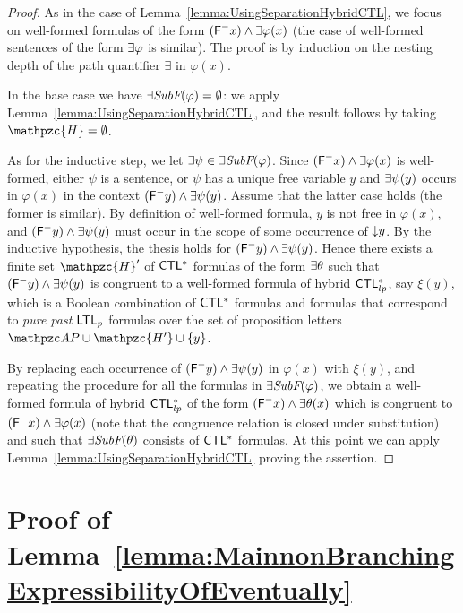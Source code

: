 \begin{proof}
As in the case of Lemma~\ref{lemma:UsingSeparationHybridCTL}, we focus on well-formed formulas of the form  $(\textsf{F}^{-} x)\wedge \exists \varphi(x)$ (the case of well-formed sentences of the form $\exists\varphi$ is similar).
%
The proof is by induction on the nesting depth of the path quantifier $\exists$ in $\varphi(x)$. 

In the base case we have $\exists\textit{SubF}(\varphi)=\emptyset$: we apply Lemma~\ref{lemma:UsingSeparationHybridCTL}, and the result follows by taking  $\mathpzc{H}=\emptyset$. 

As for the inductive step, 
we let $\exists \psi\in \exists\textit{SubF}(\varphi)$. Since $(\textsf{F}^{-} x)\wedge \exists \varphi(x)$ is well-formed, either $\psi$ is a sentence, or $\psi$ has a unique free variable $y$ and $\exists \psi(y)$ occurs in $\varphi(x)$ in the context $(\textsf{F}^{-} y)\wedge \exists \psi(y)$. Assume that the latter case holds (the former is similar). 
By definition of well-formed formula, $y$ is not free in $\varphi(x)$, and $(\textsf{F}^{-} y)\wedge \exists \psi(y)$ must occur in the scope of some occurrence of  $\text{$\downarrow$$y$}$.
By the inductive hypothesis, the thesis holds for $(\textsf{F}^{-} y)\wedge \exists \psi(y)$. Hence there exists 
a finite set $\mathpzc{H}'$ of $\text{\sffamily CTL$^{*}$}$ formulas of the form $\exists\theta$ such that $(\textsf{F}^{-} y)\wedge \exists \psi(y)$ is congruent to a well-formed formula of hybrid $\text{\sffamily CTL$^{*}_{lp}$}$, say $\xi(y)$, which is a Boolean combination of $\text{\sffamily CTL$^{*}$}$ formulas and formulas that correspond to  \emph{pure past}  $\text{\sffamily LTL$_p$}$ formulas over the set of proposition letters
$\Prop\cup  \mathpzc{H'} \cup \{y\}$. 

By replacing each occurrence of $(\textsf{F}^{-} y)\wedge \exists \psi(y)$ in $\varphi(x)$ with $\xi(y)$, and repeating the procedure for all the formulas in   $\exists\textit{SubF}(\varphi)$, we obtain a well-formed formula of hybrid $\text{\sffamily CTL$^{*}_{lp}$}$ of the form $(\textsf{F}^{-} x)\wedge \exists \theta(x)$ which is congruent to $(\textsf{F}^{-} x)\wedge \exists \varphi(x)$ (note that the congruence relation is closed under substitution) and such that $\exists\textit{SubF}(\theta)$ consists of $\text{\sffamily CTL$^{*}$}$ formulas. At this point we can apply Lemma~\ref{lemma:UsingSeparationHybridCTL} proving the assertion.
\end{proof}


\section{Proof of Lemma~\ref{lemma:MainnonBranchingExpressibilityOfEventually}}\label{proof:lemma:MainnonBranchingExpressibilityOfEventually}

